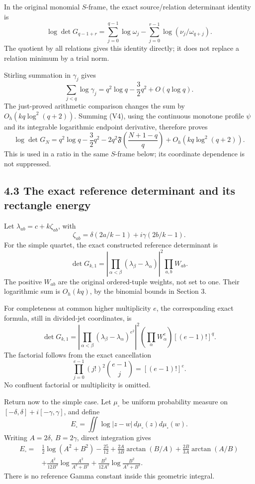 In the original monomial \(S\)-frame, the exact source/relation determinant identity is \[
 \log\det G_{q-1+r}
 =\sum_{j=0}^{q-1}\log\omega_j
  -\sum_{j=0}^{r-1}\log(\nu_j/\omega_{q+j}). \tag{V5}
\] The quotient by all relations gives this identity directly; it does not replace a relation minimum by a trial norm.

Stirling summation in \(\gamma_j\) gives \[
 \sum_{j<q}\log\gamma_j
 =q^2\log q-\frac32q^2+O(q\log q).
\] The just-proved arithmetic comparison changes the sum by \(O_h(kq\log^2(q+2))\). Summing (V4), using the continuous monotone profile \(\psi\) and its integrable logarithmic endpoint derivative, therefore proves \[
 \boxed{
 \log\det G_N
 =q^2\log q-\frac32q^2
  -2q^2\mathfrak F\!\left(\frac{N+1-q}{q}\right)
  +O_h(kq\log^2(q+2)).
 } \tag{V6}
\] This is used in a ratio in the same \(S\)-frame below; its coordinate dependence is not suppressed.

\subsection{4.3 The exact reference determinant and its rectangle energy}\label{the-exact-reference-determinant-and-its-rectangle-energy}

Let \(\lambda_{ab}=c+k\zeta_{ab}\), with \[
 \zeta_{ab}=\delta(2a/k-1)+i\gamma(2b/k-1).
\] For the simple quartet, the exact constructed reference determinant is \[
 \det G_{k,1}
 =\left|\prod_{\alpha<\beta}
   (\lambda_\beta-\lambda_\alpha)\right|^2
   \prod_{a,b}W_{ab}. \tag{V7}
\] The positive \(W_{ab}\) are the original ordered-tuple weights, not set to one. Their logarithmic sum is \(O_h(kq)\), by the binomial bounds in Section 3.

For completeness at common higher multiplicity \(e\), the corresponding exact formula, still in divided-jet coordinates, is \[
 \boxed{
 \det G_{k,1}
 =\left|\prod_{\alpha<\beta}
   (\lambda_\beta-\lambda_\alpha)^{e^2}\right|^2
   \left(\prod_{\alpha}W_\alpha^e\right)
   [(e-1)!]^q.
 } \tag{V8}
\] The factorial follows from the exact cancellation \[
 \prod_{j=0}^{e-1}(j!)^2\binom{e-1}{j}=[(e-1)!]^e.
\] No confluent factorial or multiplicity is omitted.

Return now to the simple case. Let \(\mu_\square\) be uniform probability measure on \([-\delta,\delta]+i[-\gamma,\gamma]\), and define \[
 E_\square=\iint\log|z-w|\,d\mu_\square(z)d\mu_\square(w).
\] Writing \(A=2\delta,\ B=2\gamma\), direct integration gives \[
 \boxed{\begin{aligned}
 E_\square={}&
 \frac12\log(A^2+B^2)-\frac{25}{12}
 +\frac{2A}{3B}\arctan(B/A)+\frac{2B}{3A}\arctan(A/B)\\
 &+\frac{A^2}{12B^2}\log\frac{A^2}{A^2+B^2}
 +\frac{B^2}{12A^2}\log\frac{B^2}{A^2+B^2}.
 \end{aligned}} \tag{V9}
\] There is no reference Gamma constant inside this geometric integral.

